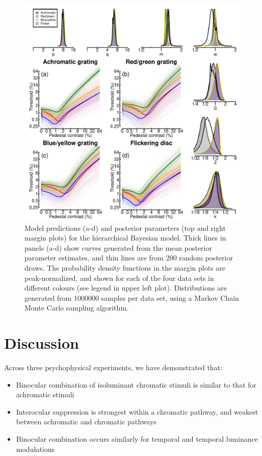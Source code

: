 \documentclass[
]{article}
\providecommand{\tightlist}{%
  \setlength{\itemsep}{0pt}\setlength{\parskip}{0pt}}
\begin{document}
\begin{figure}

{\centering \includegraphics{Figures/stanoutput} 

}

\caption{Model predictions (a-d) and posterior parameters (top and right margin plots) for the hierarchical Bayesian model. Thick lines in panels (a-d) show curves generated from the mean posterior parameter estimates, and thin lines are from 200 random posterior draws. The probability density functions in the margin plots are peak-normalized, and shown for each of the four data sets in different colours (see legend in upper left plot). Distributions are generated from 1000000 samples per data set, using a Markov Chain Monte Carlo sampling algorithm.}\label{fig:bayesianmodel}
\end{figure}

\hypertarget{discussion}{%
\section{Discussion}\label{discussion}}

Across three psychophysical experiments, we have demonstrated that:

\begin{itemize}
\tightlist
\item
  Binocular combination of isoluminant chromatic stimuli is similar to that for achromatic stimuli
\item
  Interocular suppression is strongest within a chromatic pathway, and weakest between achromatic and chromatic pathways
\item
  Binocular combination occurs similarly for temporal and temporal luminance modulations
\end{itemize}
\end{document}
